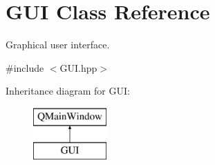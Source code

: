 \hypertarget{classGUI}{}\section{G\+UI Class Reference}
\label{classGUI}


Graphical user interface.  




{\ttfamily \#include $<$G\+U\+I.\+hpp$>$}

Inheritance diagram for G\+UI\+:\begin{figure}[H]
\begin{center}
\leavevmode
\includegraphics[height=2.000000cm]{classGUI}
\end{center}
\end{figure}
